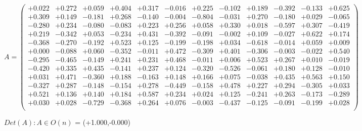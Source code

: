 \documentclass[9pt]{article}
\theoremstyle{plain}
\theoremstyle{definition}
\theoremstyle{remark}
\numberwithin{equation}{section}
\begin{document}
$A = \left(
\begin{array}{
cccccccccccc}
+0.022 & +0.272 & +0.059 & +0.404 & +0.317 & -0.016 & +0.225 & -0.102 & +0.189 & -0.392 & -0.133 & +0.625 \\
+0.309 & +0.149 & -0.181 & +0.268 & -0.140 & -0.004 & -0.804 & -0.031 & +0.270 & -0.180 & +0.029 & -0.065 \\
-0.280 & +0.234 & -0.080 & -0.083 & +0.223 & +0.256 & +0.058 & +0.330 & +0.018 & -0.597 & +0.307 & -0.419 \\
+0.219 & -0.342 & +0.053 & -0.234 & +0.431 & -0.392 & -0.091 & -0.002 & +0.109 & -0.027 & +0.622 & +0.174 \\
-0.368 & -0.270 & -0.192 & +0.523 & +0.125 & -0.199 & -0.198 & +0.034 & -0.618 & -0.014 & +0.059 & +0.009 \\
+0.000 & -0.088 & +0.060 & -0.352 & -0.011 & +0.472 & -0.309 & +0.401 & -0.306 & -0.003 & -0.022 & +0.540 \\
-0.295 & -0.465 & -0.149 & +0.241 & +0.231 & +0.468 & -0.011 & +0.006 & +0.523 & +0.267 & +0.010 & -0.019 \\
-0.420 & +0.335 & +0.435 & -0.141 & +0.237 & +0.124 & -0.320 & -0.526 & -0.061 & +0.180 & +0.128 & -0.010 \\
+0.031 & +0.471 & -0.360 & +0.188 & -0.163 & +0.148 & +0.166 & +0.075 & -0.038 & +0.435 & +0.563 & +0.150 \\
-0.327 & +0.287 & -0.148 & -0.154 & +0.278 & -0.449 & -0.158 & +0.478 & +0.227 & +0.294 & -0.305 & +0.033 \\
+0.521 & +0.136 & +0.140 & +0.184 & +0.587 & +0.234 & +0.024 & +0.125 & -0.241 & +0.263 & -0.173 & -0.289 \\
+0.030 & +0.028 & -0.729 & -0.368 & +0.264 & +0.076 & -0.003 & -0.437 & -0.125 & -0.091 & -0.199 & +0.028 \\
\end{array}
\right)$ \newline 

$Det(A) :   A \in O(n)$ = (+1.000,-0.000)
\end{document}
